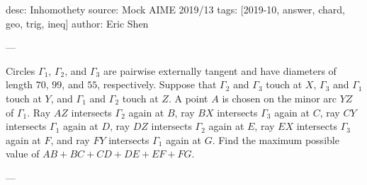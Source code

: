 desc: Inhomothety
source: Mock AIME 2019/13
tags: [2019-10, answer, chard, geo, trig, ineq]
author: Eric Shen

---

Circles $\Gamma_1$, $\Gamma_2$, and $\Gamma_3$ are pairwise externally tangent and have diameters of length $70$, $99$, and $55$, respectively. Suppose that $\Gamma_2$ and $\Gamma_3$ touch at $X$, $\Gamma_3$ and $\Gamma_1$ touch at $Y$, and $\Gamma_1$ and $\Gamma_2$ touch at $Z$. A point $A$ is chosen on the minor arc $YZ$ of $\Gamma_1$. Ray $AZ$ intersects $\Gamma_2$ again at $B$, ray $BX$ intersects $\Gamma_3$ again at $C$, ray $CY$ intersects $\Gamma_1$ again at $D$, ray $DZ$ intersects $\Gamma_2$ again at $E$, ray $EX$ intersects $\Gamma_3$ again at $F$, and ray $FY$ intersects $\Gamma_1$ again at $G$. Find the maximum possible value of $AB+BC+CD+DE+EF+FG$.

---

